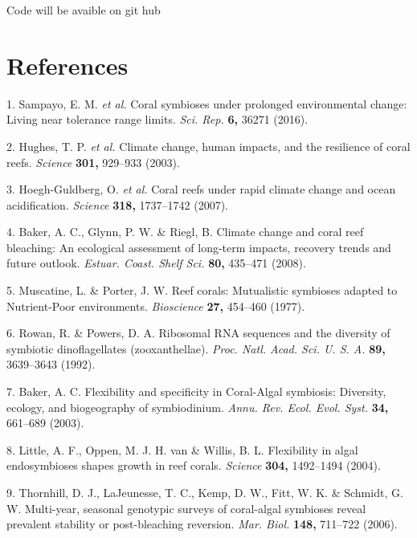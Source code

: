 \documentclass[]{article}
\begin{document}
Code will be avaible on git hub

\section*{References}\label{references}

\hypertarget{refs}{}
\hypertarget{ref-Sampayo2016-vd}{}
1. Sampayo, E. M. \emph{et al.} Coral symbioses under prolonged
environmental change: Living near tolerance range limits. \emph{Sci.
Rep.} \textbf{6,} 36271 (2016).

\hypertarget{ref-Hughes2003-aj}{}
2. Hughes, T. P. \emph{et al.} Climate change, human impacts, and the
resilience of coral reefs. \emph{Science} \textbf{301,} 929--933 (2003).

\hypertarget{ref-Hoegh-Guldberg2007-fh}{}
3. Hoegh-Guldberg, O. \emph{et al.} Coral reefs under rapid climate
change and ocean acidification. \emph{Science} \textbf{318,} 1737--1742
(2007).

\hypertarget{ref-Baker2008-ky}{}
4. Baker, A. C., Glynn, P. W. \& Riegl, B. Climate change and coral reef
bleaching: An ecological assessment of long-term impacts, recovery
trends and future outlook. \emph{Estuar. Coast. Shelf Sci.} \textbf{80,}
435--471 (2008).

\hypertarget{ref-Muscatine1977-pn}{}
5. Muscatine, L. \& Porter, J. W. Reef corals: Mutualistic symbioses
adapted to Nutrient-Poor environments. \emph{Bioscience} \textbf{27,}
454--460 (1977).

\hypertarget{ref-Rowan1992-lg}{}
6. Rowan, R. \& Powers, D. A. Ribosomal RNA sequences and the diversity
of symbiotic dinoflagellates (zooxanthellae). \emph{Proc. Natl. Acad.
Sci. U. S. A.} \textbf{89,} 3639--3643 (1992).

\hypertarget{ref-Baker2003-ks}{}
7. Baker, A. C. Flexibility and specificity in Coral-Algal symbiosis:
Diversity, ecology, and biogeography of symbiodinium. \emph{Annu. Rev.
Ecol. Evol. Syst.} \textbf{34,} 661--689 (2003).

\hypertarget{ref-Little2004-tm}{}
8. Little, A. F., Oppen, M. J. H. van \& Willis, B. L. Flexibility in
algal endosymbioses shapes growth in reef corals. \emph{Science}
\textbf{304,} 1492--1494 (2004).

\hypertarget{ref-Thornhill2006-cs}{}
9. Thornhill, D. J., LaJeunesse, T. C., Kemp, D. W., Fitt, W. K. \&
Schmidt, G. W. Multi-year, seasonal genotypic surveys of coral-algal
symbioses reveal prevalent stability or post-bleaching reversion.
\emph{Mar. Biol.} \textbf{148,} 711--722 (2006).
\end{document}
